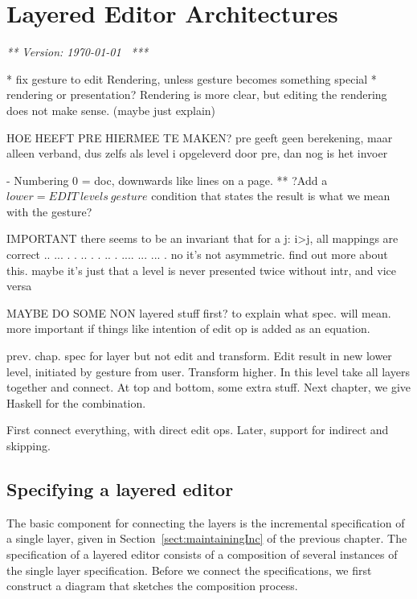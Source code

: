 \chapter{Layered Editor Architectures}
\label{chap:layeredArchs}
{\em *** Version: \today~ ***}



\bc
* fix gesture to edit Rendering, unless gesture becomes something special
* rendering or presentation? Rendering is more clear, but editing the rendering does not make sense. (maybe just explain)

HOE HEEFT PRE HIERMEE TE MAKEN? pre geeft geen berekening, maar alleen verband, dus zelfs als level i opgeleverd door pre, dan nog is het invoer

- Numbering 0 = doc, downwards like lines on a page.
** ?Add a $lower = EDIT~levels~gesture$ condition that states the result is what we mean with the gesture?



IMPORTANT there seems to be an invariant that for a j:  i>j, all mappings are correct 
  ..           ...       
 .  .    ..   .   .   .. 
.    ....  ...     ...  .
 no it's not asymmetric. find out more about this.
 maybe it's just that a level is never presented twice without intr, and vice versa



\ec
MAYBE DO SOME NON layered stuff first? to explain what spec. will mean. more important if things like intention of edit op is added as an equation.



prev. chap. spec for layer but not edit and transform. Edit result in new lower level, initiated by gesture from user. Transform higher. In this level take all layers together and connect. At top and bottom, some extra stuff.
Next chapter, we give Haskell for the combination.


First connect everything, with direct edit ops. 
Later, support for indirect and skipping.
\fromHere  %

\section{Specifying a layered editor}

The basic component for connecting the layers is the incremental specification of a single layer, given in Section~\ref{sect:maintainingInc} of the previous chapter. The specification of a layered editor consists of a composition of several instances of the single layer specification. Before we connect the specifications, we first construct a diagram that sketches the composition process.


